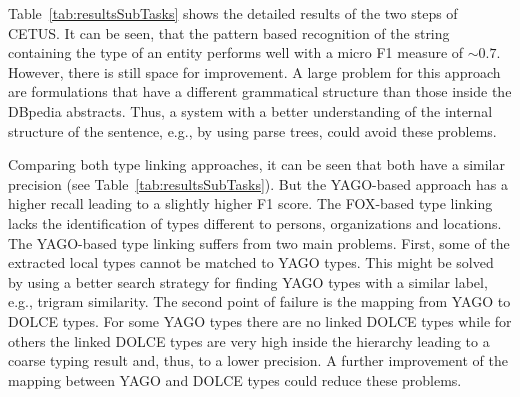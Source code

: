 Table~\ref{tab:resultsSubTasks} shows the detailed results of the two steps of CETUS.
It can be seen, that the pattern based recognition of the string containing the type of an entity performs well with a micro F1 measure of $\sim0.7$.
However, there is still space for improvement.
A large problem for this approach are formulations that have a different grammatical structure than those inside the DBpedia abstracts.
Thus, a system with a better understanding of the internal structure of the sentence, e.g., by using parse trees, could avoid these problems.

Comparing both type linking approaches, it can be seen that both have a similar precision (see Table~\ref{tab:resultsSubTasks}).
But the YAGO-based approach has a higher recall leading to a slightly higher F1 score.
The FOX-based type linking lacks the identification of types different to persons, organizations and locations.
The YAGO-based type linking suffers from two main problems.
First, some of the extracted local types cannot be matched to YAGO types.
This might be solved by using a better search strategy for finding YAGO types with a similar label, e.g., trigram similarity.
The second point of failure is the mapping from YAGO to DOLCE types.
For some YAGO types there are no linked DOLCE types while for others the linked DOLCE types are very high inside the hierarchy leading to a coarse typing result and, thus, to a lower precision.
A further improvement of the mapping between YAGO and DOLCE types could reduce these problems.

